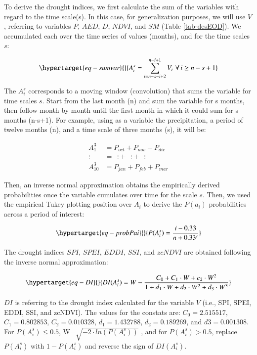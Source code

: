 \documentclass[
  authoryear,
  preprint,
  3p,
  onecolumn]{elsarticle}
\begin{document}
To derive the drought indices, we first calculate the sum of the
variables with regard to the time scale(s). In this case, for
generalization purposes, we will use \(V\), referring to variables
\(P\), \(AED\), \(D\), \(NDVI\), and \(SM\) (Table \ref{tab-desEOD}). We
accumulated each over the time series of values (months), and for the
time scales \(s\):

\begin{equation}\protect\hypertarget{eq-sumvar}{}{A^s_i = \sum_{i=n-s-i+2}^{n-i+1} V_i\,\, \forall\, i\geq n-s+1  }\label{eq-sumvar}\end{equation}

The \(A^s_i\) corresponds to a moving window (convolution) that sums the
variable for time scales \(s\). Start from the last month (n) and sum
the variable for s months, then follow month by month until the first
month in which it could sum for s months (n-s+1). For example, using as
a variable the precipitation, a period of twelve months (n), and a time
scale of three months (s), it will be:

\[
\begin{split}
A^3_1 &= P_{oct} +P_{nov} +P_{dic} \\
\vdots\,\,\, &= \,\,\,\vdots + \,\,\,\vdots + \,\,\,\vdots \\
A^3_{10} &= P_{jan}+P_{feb} +P_{mar}
\end{split}
\]

Then, an inverse normal approximation \citep{Abramowitz1968} obtains the
empirically derived probabilities once the variable cumulates over time
for the scale \(s\). Then, we used the empirical Tukey plotting position
\citep{Wilks2011} over \(A_i\) to derive the \(P(a_i)\) probabilities
across a period of interest:

\begin{equation}\protect\hypertarget{eq-probPai}{}{P(A^s_i) = \frac{i-0.33}{n+0.33'}}\label{eq-probPai}\end{equation}

The drought indices \(SPI\), \(SPEI\), \(EDDI\), \(SSI\), and \(zcNDVI\)
are obtained following the inverse normal approximation:

\begin{equation}\protect\hypertarget{eq-DI}{}{DI(A^s_i) = W - \frac{C_0+C_1\cdot W + c_2 \cdot W^2}{1+d_1\cdot W +d_2\cdot W^2 +d_3\cdot W^3}}\label{eq-DI}\end{equation}

\(DI\) is referring to the drought index calculated for the variable
\(V\) (i.e., SPI, SPEI, EDDI, SSI, and zcNDVI). The values for the
constats are: \(C_0 = 2.515517\), \(C_1 = 0.802853\),
\(C_2 = 0.010328\), \(d_1 = 1.432788\), \(d_2 = 0.189269\), and
\(d3 = 0.001308\). For \(P(A^s_i) \leq 0.5\),
W=\(\sqrt{-2\cdot ln(P(A^s_i))}\) , and for \(P(A^s_i) > 0.5\), replace
\(P(A^s_i)\) with \(1-P(A^s_i)\) and reverse the sign of \(DI(A^s_i)\).
\end{document}
